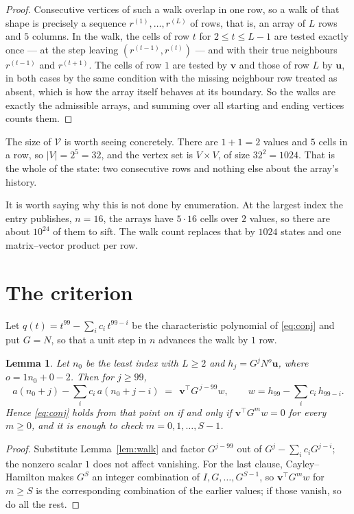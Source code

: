 \documentclass[11pt,a4paper]{article}
\theoremstyle{plain}
\newtheorem{lemma}[theorem]{Lemma}
\theoremstyle{definition}
\begin{document}
\begin{proof}
Consecutive vertices of such a walk overlap in one row, so a walk of that shape is
precisely a sequence $r^{(1)},\dots,r^{(L)}$ of rows, that is, an array of $L$ rows
and $5$ columns. In the walk, the cells of row $t$ for $2\le t\le L-1$ are tested
exactly once --- at the step leaving $(r^{(t-1)},r^{(t)})$ --- and with their true
neighbours $r^{(t-1)}$ and $r^{(t+1)}$. The cells of row $1$ are tested by
$\mathbf{v}$ and those of row $L$ by $\mathbf{u}$, in both cases by the same condition
with the missing neighbour row treated as absent, which is how the array itself behaves at
its boundary. So the walks are exactly the admissible arrays, and summing over all starting
and ending vertices counts them.
\end{proof}


The size of $\mathcal V$ is worth seeing concretely. There are $1+1=2$ values
and $5$ cells in a row, so $|V|=2^{5}=32$, and the vertex set is
$V\times V$, of size $32^2=1024$. That is the whole of the state: two consecutive
rows and nothing else about the array's history.

It is worth saying why this is not done by enumeration. At the largest index the entry
publishes, $n=16$, the arrays have $5\cdot16$ cells over
$2$ values, so there are about $10^{24}$ of them to sift. The
walk count replaces that by $1024$ states and one matrix--vector product per row.
\section{The criterion}

Let $q(t)=t^{99}-\sum_i c_i\,t^{99-i}$ be the characteristic polynomial of
\eqref{eq:conj} and put $G=N$, so that a unit step in $n$ advances the walk by
$1$ row.

\begin{lemma}\label{lem:crit}
Let $n_0$ be the least index with $L\ge2$ and $h_j=G^{j}N^{o}\mathbf{u}$, where
$o=1n_0+0-2$. Then for $j\ge99$,
\[
a(n_0+j)-\sum_i c_i\,a(n_0+j-i)\;=\;\,\mathbf{v}^{\!\top}G^{\,j-99}w,
\qquad w=h_{99}-\sum_i c_i\,h_{99-i} .
\]
Hence \eqref{eq:conj} holds from that point on if and only if
$\mathbf{v}^{\!\top}G^{m}w=0$ for every $m\ge0$, and it is enough to check
$m=0,1,\dots,S-1$.
\end{lemma}

\begin{proof}
Substitute Lemma~\ref{lem:walk} and factor $G^{j-99}$ out of
$G^{j}-\sum_ic_iG^{j-i}$; the nonzero scalar $1$ does not affect
vanishing. For the last clause, Cayley--Hamilton makes $G^{S}$ an integer combination of
$I,G,\dots,G^{S-1}$, so $\mathbf{v}^{\!\top}G^{m}w$ for $m\ge S$ is the corresponding
combination of the earlier values; if those vanish, so do all the rest.
\end{proof}
\end{document}

